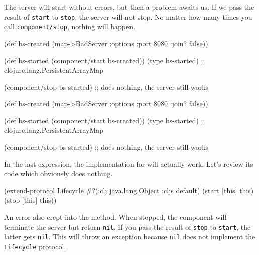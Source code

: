 The server will start without errors, but then a problem awaits us. If we pass the result of \verb|start| to \verb|stop|, the server will not stop. No matter how many times you call \verb|component/stop|, nothing will happen.

\ifnarrow

\begin{english}
  \begin{clojure}
(def bs-created
  (map->BadServer
    {:options {:port 8080
               :join? false}}))

(def bs-started
   (component/start bs-created))
(type bs-started)
;; clojure.lang.PersistentArrayMap

(component/stop bs-started)
;; does nothing, the server still works
  \end{clojure}
\end{english}

\else

\begin{english}
  \begin{clojure}
(def bs-created (map->BadServer
                  {:options {:port 8080 :join? false}}))

(def bs-started (component/start bs-created))
(type bs-started)
;; clojure.lang.PersistentArrayMap

(component/stop bs-started)
;; does nothing, the server still works
  \end{clojure}
\end{english}

\fi

In the last expression, the  implementation for  will actually work. Let's review its code which obviously does nothing.

\begin{english}
  \begin{clojure}
(extend-protocol Lifecycle
  #?(:clj java.lang.Object :cljs default)
  (start [this]
    this)
  (stop [this]
    this))
  \end{clojure}
\end{english}

An error also crept into the  method. When stopped, the component will terminate the server but return \verb|nil|. If you pass the result of \verb|stop| to \verb|start|, the latter gets \verb|nil|. This will throw an exception because \verb|nil| does not implement the \verb|Lifecycle| protocol.


